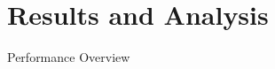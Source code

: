 \documentclass{beamer}
\begin{document}
\section{Results and Analysis}
\begin{frame}{Performance Overview}
        

\end{frame}
\end{document}
